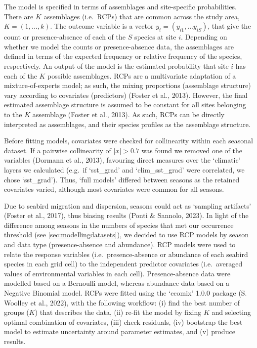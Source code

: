 \documentclass{article}
\begin{document}
\begin{linenumbers}
The model is specified in terms of assemblages and site-specific probabilities. There are \(K\) assemblages (i.e.~RCPs) that are common across the study area, \(K = (1, ..., k)\). The outcome variable is a vector \(y_{i} = (y_{i1}, ... y_{iS})\), that give the count or presence-absence of each of the \(S\) species at site \(i\). Depending on whether we model the counts or presence-absence data, the assemblages are defined in terms of the expected frequency or relative frequency of the species, respectively. An output of the model is the estimated probability that site \(i\) has each of the \(K\) possible assemblages. RCPs are a multivariate adaptation of a mixture-of-experts model; as such, the mixing proportions (assemblage structure) vary according to covariates (predictors) (Foster et al., 2013). However, the final estimated assemblage structure is assumed to be constant for all sites belonging to the \(K\) assemblage (Foster et al., 2013). As such, RCPs can be directly interpreted as assemblages, and their species profiles as the assemblage structure.

Before fitting models, covariates were checked for collinearity within each seasonal dataset. If a pairwise collinearity of \(\left|x\right| >0.7\) was found we removed one of the variables (Dormann et al., 2013), favouring direct measures over the `climatic' layers we calculated (e.g.~if `sst\_grad' and `clim\_sst\_grad' were correlated, we chose `sst\_grad'). Thus, `full models' differed between seasons as the retained covariates varied, although most covariates were common for all seasons.

Due to seabird migration and dispersion, seasons could act as `sampling artifacts' (Foster et al., 2017), thus biasing results (Ponti \& Sannolo, 2023). In light of the difference among seasons in the numbers of species that met our occurrence threshold (see \ref{sec:modellingdatasets}), we decided to use RCP models by season and data type (presence-absence and abundance). RCP models were used to relate the response variables (i.e.~presence-absence or abundance of each seabird species in each grid cell) to the independent predictor covariates (i.e.~averaged values of environmental variables in each cell). Presence-absence data were modelled based on a Bernoulli model, whereas abundance data based on a Negative Binomial model. RCPs were fitted using the `ecomix' 1.0.0 package (S. Woolley et al., 2022), with the following workflow: (i) find the best number of groups (\(K\)) that describes the data, (ii) re-fit the model by fixing \(K\) and selecting optimal combination of covariates, (iii) check residuals, (iv) bootstrap the best model to estimate uncertainty around parameter estimates, and (v) produce results.


\end{linenumbers}
\end{document}
